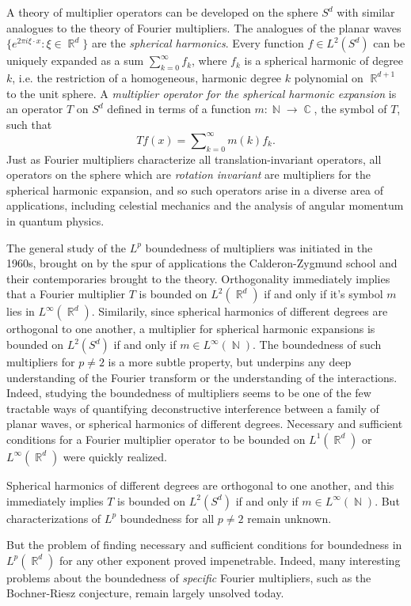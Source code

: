 \documentclass[12pt]{article}
\DeclareMathOperator{\RR}{\mathbb{R}}
\DeclareMathOperator{\NN}{\mathbb{N}}
\DeclareMathOperator{\CC}{\mathbb{C}}
\begin{document}
A theory of multiplier operators can be developed on the sphere $S^d$ with similar analogues to the theory of Fourier multipliers. The analogues of the planar waves $\{ e^{2 \pi i \xi \cdot x} : \xi \in \RR^d \}$ are the \emph{spherical harmonics}. Every function $f \in L^2(S^d)$ can be uniquely expanded as a sum $\sum_{k = 0}^\infty f_k$, where $f_k$ is a spherical harmonic of degree $k$, i.e. the restriction of a homogeneous, harmonic degree $k$ polynomial on $\RR^{d+1}$ to the unit sphere. A \emph{multiplier operator for the spherical harmonic expansion} is an operator $T$ on $S^d$ defined in terms of a function $m: \NN \to \CC$, the symbol of $T$, such that
%
\[ Tf(x) = \sum\nolimits_{k = 0}^\infty m(k) f_k. \]
%
Just as Fourier multipliers characterize all translation-invariant operators, all operators on the sphere which are \emph{rotation invariant} are multipliers for the spherical harmonic expansion, and so such operators arise in a diverse area of applications, including celestial mechanics and the analysis of angular momentum in quantum physics.

The general study of the $L^p$ boundedness of multipliers was initiated in the 1960s, brought on by the spur of applications the Calderon-Zygmund school and their contemporaries brought to the theory. Orthogonality immediately implies that a Fourier multiplier $T$ is bounded on $L^2(\RR^d)$ if and only if it's symbol $m$ lies in $L^\infty(\RR^d)$. Similarily, since spherical harmonics of different degrees are orthogonal to one another, a multiplier for spherical harmonic expansions is bounded on $L^2(S^d)$ if and only if $m \in L^\infty(\NN)$. The boundedness of such multipliers for $p \neq 2$ is a more subtle property, but underpins any deep understanding of the Fourier transform or the understanding of the interactions. Indeed, studying the boundedness of multipliers seems to be one of the few tractable ways of quantifying deconstructive interference between a family of planar waves, or spherical harmonics of different degrees. Necessary and sufficient conditions for a Fourier multiplier operator to be bounded on $L^1(\RR^d)$ or $L^\infty(\RR^d)$ were quickly realized.


Spherical harmonics of different degrees are orthogonal to one another, and this immediately implies $T$ is bounded on $L^2(S^d)$ if and only if $m \in L^\infty(\NN)$. But characterizations of $L^p$ boundedness for all $p \neq 2$ remain unknown.


But the problem of finding necessary and sufficient conditions for boundedness in $L^p(\RR^d)$ for any other exponent proved impenetrable. Indeed, many interesting problems about the boundedness of \emph{specific} Fourier multipliers, such as the Bochner-Riesz conjecture, remain largely unsolved today.
\end{document}
